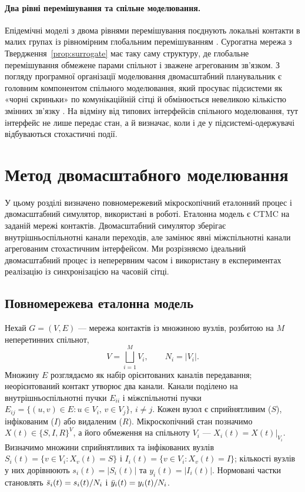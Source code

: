 \paragraph{Два рівні перемішування та спільне моделювання.}
Епідемічні моделі з двома рівнями перемішування поєднують локальні контакти в малих групах із рівномірним глобальним перемішуванням \citep{ball1997}. Сурогатна мережа з Твердження~\ref{prop:surrogate} має таку саму структуру, де глобальне перемішування обмежене парами спільнот і зважене агрегованим зв'язком. З погляду програмної організації моделювання двомасштабний планувальник є головним компонентом спільного моделювання, який просуває підсистеми як «чорні скриньки» по комунікаційній сітці й обмінюється невеликою кількістю змінних зв'язку \citep{gomes2018cosim}. На відміну від типових інтерфейсів спільного моделювання, тут інтерфейс не лише передає стан, а й визначає, коли і де у підсистемі-одержувачі відбуваються стохастичні події.

\section{Метод двомасштабного моделювання}
\label{sec:method}

У цьому розділі визначено повномережевий мікроскопічний еталонний процес і двомасштабний симулятор, використані в роботі. Еталонна модель є CTMC на заданій мережі контактів. Двомасштабний симулятор зберігає внутрішньоспільнотні канали переходів, але замінює явні міжспільнотні канали агрегованим стохастичним інтерфейсом. Ми розрізняємо ідеальний двомасштабний процес із неперервним часом і використану в експериментах реалізацію із синхронізацією на часовій сітці.

\subsection{Повномережева еталонна модель}
\label{sec:reference}

Нехай $G=(V,E)$ --- мережа контактів із множиною вузлів, розбитою на $M$ неперетинних спільнот,
\begin{equation}
\label{eq:partition}
V=\bigsqcup_{i=1}^{M}V_i,\qquad N_i=|V_i|.
\end{equation}
Множину $E$ розглядаємо як набір орієнтованих каналів передавання; неорієнтований контакт утворює два канали. Канали поділено на внутрішньоспільнотні пучки $E_{ii}$ і міжспільнотні пучки $E_{ij}=\{(u,v)\in E:u\in V_i,\,v\in V_j\}$, $i\neq j$. Кожен вузол є сприйнятливим ($S$), інфікованим ($I$) або видаленим ($R$). Мікроскопічний стан позначимо $X(t)\in\{S,I,R\}^{V}$, а його обмеження на спільноту $V_i$ --- $X_i(t)=X(t)|_{V_i}$. Визначимо множини сприйнятливих та інфікованих вузлів $S_i(t)=\{v\in V_i:X_v(t)=S\}$ і $I_i(t)=\{v\in V_i:X_v(t)=I\}$; кількості вузлів у них дорівнюють $s_i(t)=|S_i(t)|$ та $y_i(t)=|I_i(t)|$. Нормовані частки становлять $\bar{s}_i(t)=s_i(t)/N_i$ і $\bar{y}_i(t)=y_i(t)/N_i$.

